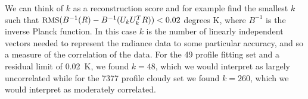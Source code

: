 \documentclass[11pt]{article}
\begin{document}
We can think of $k$ as a reconstruction score and for example find
the smallest $k$ such that $\mbox{\small RMS}(B^{-1}(R) - B^{-1}(U_k U_k^T R)) <
0.02$ degrees K, where $B^{-1}$ is the inverse Planck function.  In
this case $k$ is the number of linearly independent vectors needed
to represent the radiance data to some particular accuracy, and so a
measure of the correlation of the data.  For the 49 profile fitting
set and a residual limit of 0.02~K, we found $k=48$, which we would
interpret as largely uncorrelated while for the 7377 profile cloudy
set we found $k=260$, which we would interpret as moderately
correlated.

\FloatBarrier


\end{document}
